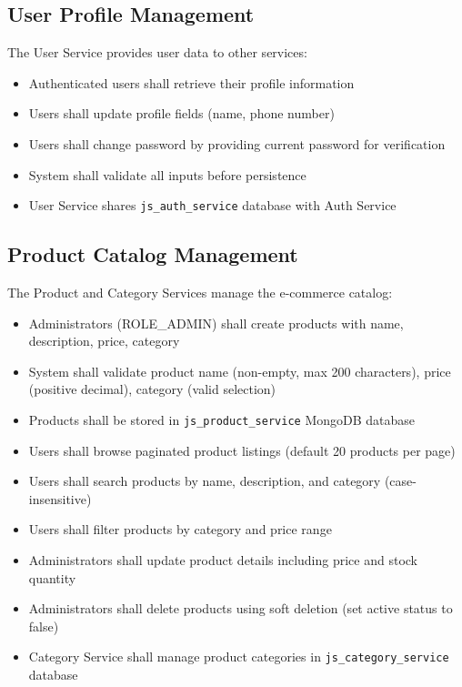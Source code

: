 \subsection{User Profile Management}

The User Service provides user data to other services:

\begin{itemize}
    \item Authenticated users shall retrieve their profile information
    \item Users shall update profile fields (name, phone number)
    \item Users shall change password by providing current password for verification
    \item System shall validate all inputs before persistence
    \item User Service shares \texttt{js\_auth\_service} database with Auth Service
\end{itemize}

\subsection{Product Catalog Management}

The Product and Category Services manage the e-commerce catalog:

\begin{itemize}
    \item Administrators (ROLE\_ADMIN) shall create products with name, description, price, category
    \item System shall validate product name (non-empty, max 200 characters), price (positive decimal), category (valid selection)
    \item Products shall be stored in \texttt{js\_product\_service} MongoDB database
    \item Users shall browse paginated product listings (default 20 products per page)
    \item Users shall search products by name, description, and category (case-insensitive)
    \item Users shall filter products by category and price range
    \item Administrators shall update product details including price and stock quantity
    \item Administrators shall delete products using soft deletion (set active status to false)
    \item Category Service shall manage product categories in \texttt{js\_category\_service} database
\end{itemize}


